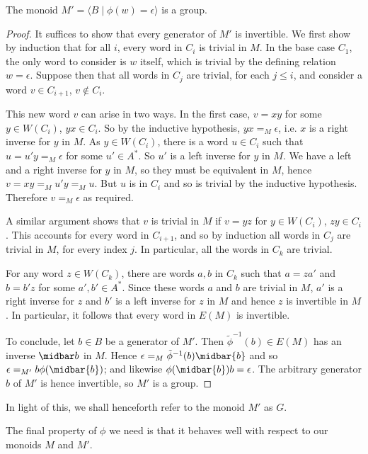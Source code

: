 \documentclass[noindex,noinsetproof,12pt]{lmaths}
\begin{document}
\begin{prop} \label{prop:M'-is-group}
	The monoid $M' = \langle B \mid \phi(w) = \epsilon\rangle$ is a group.
\end{prop}
\begin{proof}
	It suffices to show that every generator of $M'$ is invertible. We first show by induction that for all $i$, every word in $C_i$ is trivial in $M$. In the base case $C_1$, the only word to consider is $w$ itself, which is trivial by the defining relation $w = \epsilon$. Suppose then that all words in $C_j$ are trivial, for each $j \le i$, and consider a word $v \in C_{i+1}$, $v \not\in C_i$.

	This new word $v$ can arise in two ways. In the first case, $v = xy$ for some $y \in W(C_i)$, $yx \in C_i$. So by the inductive hypothesis, $yx =_M \epsilon$, i.e. $x$ is a right inverse for $y$ in $M$. As $y \in W(C_i)$, there is a word $u \in C_i$ such that $u = u'y =_M \epsilon$ for some $u' \in A^*$. So $u'$ is a left inverse for $y$ in $M$. We have a left and a right inverse for $y$ in $M$, so they must be equivalent in $M$, hence $v = xy =_M u'y =_M u$. But $u$ is in $C_i$ and so is trivial by the inductive hypothesis. Therefore $v =_M \epsilon$ as required.

	A similar argument shows that $v$ is trivial in $M$ if $v = yz$ for $y \in W(C_i)$, $zy \in C_i$. This accounts for every word in $C_{i+1}$, and so by induction all words in $C_j$ are trivial in $M$, for every index $j$. In particular, all the words in $C_k$ are trivial.

	For any word $z \in W(C_k)$, there are words $a, b$ in $C_k$ such that $a = za'$ and $b = b'z$ for some $a', b' \in A^*$. Since these words $a$ and $b$ are trivial in $M$, $a'$ is a right inverse for $z$ and $b'$ is a left inverse for $z$ in $M$ and hence $z$ is invertible in $M$. In particular, it follows that every word in $E(M)$ is invertible.

	To conclude, let $b \in B$ be a generator of $M'$. Then $\tilde\phi^{-1}(b) \in E(M)$ has an inverse $\midbar b$ in $M$. Hence $\epsilon =_M \tilde\phi^{-1}(b) \midbar{b}$ and so $\epsilon =_{M'} b\phi(\midbar{b})$; and likewise $\phi(\midbar{b})b = \epsilon$. The arbitrary generator $b$ of $M'$ is hence invertible, so $M'$ is a group.
\end{proof}

In light of this, we shall henceforth refer to the monoid $M'$ as $G$.

The final property of $\phi$ we need is that it behaves well with respect to our monoids $M$ and $M'$.
\end{document}
